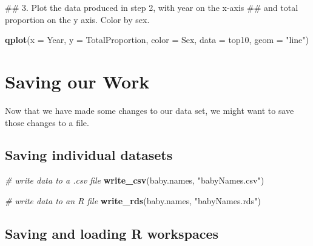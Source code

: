 \documentclass[]{book}
\newenvironment{Shaded}{\begin{snugshade}}{\end{snugshade}}
\newcommand{\KeywordTok}[1]{\textcolor[rgb]{0.13,0.29,0.53}{\textbf{#1}}}
\newcommand{\DataTypeTok}[1]{\textcolor[rgb]{0.13,0.29,0.53}{#1}}
\newcommand{\StringTok}[1]{\textcolor[rgb]{0.31,0.60,0.02}{#1}}
\newcommand{\CommentTok}[1]{\textcolor[rgb]{0.56,0.35,0.01}{\textit{#1}}}
\newcommand{\NormalTok}[1]{#1}
\begin{document}
\begin{Shaded}
\begin{Highlighting}[]
\NormalTok{## 3.  Plot the data produced in step 2, with year on the x-axis}
\NormalTok{##     and total proportion on the y axis. Color by sex.}
\end{Highlighting}
\end{Shaded}

\begin{Shaded}
\begin{Highlighting}[]
\KeywordTok{qplot}\NormalTok{(}\DataTypeTok{x =}\NormalTok{ Year, }\DataTypeTok{y =}\NormalTok{ TotalProportion, }\DataTypeTok{color =}\NormalTok{ Sex,}
      \DataTypeTok{data =}\NormalTok{ top10,}
      \DataTypeTok{geom =} \StringTok{"line"}\NormalTok{)}
\end{Highlighting}
\end{Shaded}

\section{Saving our Work}\label{saving-our-work}

Now that we have made some changes to our data set, we might want to
save those changes to a file.

\subsection{Saving individual
datasets}\label{saving-individual-datasets}

\begin{Shaded}
\begin{Highlighting}[]
\CommentTok{# write data to a .csv file}
\KeywordTok{write_csv}\NormalTok{(baby.names, }\StringTok{"babyNames.csv"}\NormalTok{)}
\end{Highlighting}
\end{Shaded}

\begin{Shaded}
\begin{Highlighting}[]
\CommentTok{# write data to an R file}
\KeywordTok{write_rds}\NormalTok{(baby.names, }\StringTok{"babyNames.rds"}\NormalTok{)}
\end{Highlighting}
\end{Shaded}

\subsection{Saving and loading R
workspaces}\label{saving-and-loading-r-workspaces}
\end{document}
